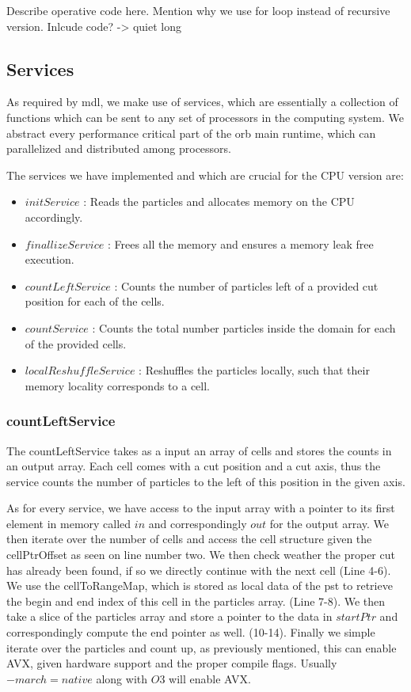 \documentclass[]{article}
\begin{document}
Describe operative code here. Mention why we use for loop instead of recursive version. Inlcude code? -> quiet long

\subsection{Services}

As required by mdl, we make use of services, which are essentially a collection of functions which can be sent to any set of processors in the computing system. We abstract every performance critical part of the orb main runtime, which can parallelized and distributed among processors.

The services we have implemented and which are crucial for the CPU version are:

\begin{itemize}
	\item $initService$ : Reads the particles and allocates memory on the CPU accordingly.
	\item $finallizeService$ : Frees all the memory and ensures a memory leak free execution.  
	\item $countLeftService$ : Counts the number of particles left of a provided cut position for each of the cells.
	\item $countService$ : Counts the total number particles inside the domain for each of the provided cells.
	\item $localReshuffleService$ : Reshuffles the particles locally, such that their memory locality corresponds to a cell. 
\end{itemize}

\subsubsection{countLeftService}

The countLeftService takes as a input an array of cells and stores the counts in an output array. Each cell comes with a cut position and a cut axis, thus the service counts the number of particles to the left of this position in the given axis. 

As for every service, we have access to the input array with a pointer to its first element in memory called $in$ and correspondingly $out$ for the output array. We then iterate over the number of cells and access the cell structure given the cellPtrOffset as seen on line number two.
We then check weather the proper cut has already been found, if so we directly continue with the next cell (Line 4-6). We use the cellToRangeMap, which is stored as local data of the pst to retrieve the begin and end index of this cell in the particles array. (Line 7-8).
We then take a slice of the particles array and store a pointer to the data in $startPtr$ and correspondingly compute the end pointer as well. (10-14).
Finally we simple iterate over the particles and count up, as previously mentioned, this can enable AVX, given hardware support and the proper compile flags. Usually $-march=native$ along with $O3$ will enable AVX. 
\end{document}
